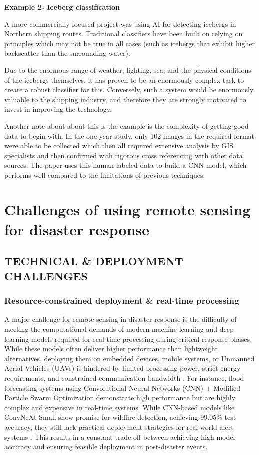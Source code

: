 \documentclass[conference,a4paper]{IEEEtran}
\begin{document}
\textbf{Example 2- Iceberg classification}

A more commercially focused project was using AI for detecting icebergs in Northern shipping routes. Traditional classifiers have been built on relying on principles which may not be true in all cases (such as icebergs that exhibit higher backscatter than the surrounding water). 

Due to the enormous range of weather, lighting, sea,  and the physical conditions of the icebergs themselves, it has proven to be an enormously complex task to create a robust classifier for this. Conversely, such a system would be enormously valuable to the shipping industry, and therefore they are strongly motivated to invest in improving the technology.

Another note about about this is the example is the complexity of getting good data to begin with. In the one year study, only 102 images in the required format were able to be collected which then all required extensive analysis by GIS specialists and then confirmed with rigorous cross referencing with other data sources. The paper uses this human labeled data to build a CNN model, which performs well compared to the limitations of previous techniques.




\section{Challenges of using remote sensing for disaster response}


\subsection{TECHNICAL \& DEPLOYMENT CHALLENGES}

\subsubsection{\textbf{Resource-constrained deployment \& real-time processing}}
A major challenge for remote sensing in disaster response is the difficulty of meeting the computational demands of modern machine learning and deep learning models required for real-time processing during critical response phases. While these models often deliver higher performance than lightweight alternatives, deploying them on embedded devices, mobile systems, or Unmanned Aerial Vehicles (UAVs) is hindered by limited processing power, strict energy requirements, and constrained communication bandwidth \cite{elbohy2025fusion}. For instance, flood forecasting systems using Convolutional Neural Networks (CNN) + Modified Particle Swarm Optimization demonstrate high performance but are highly complex and expensive in real-time systems. While CNN-based models like ConvNeXt-Small show promise for wildfire detection, achieving 99.05\% test accuracy, they still lack practical deployment strategies for real-world alert systems \cite{elbohy2025fusion}. This results in a constant trade-off between achieving high model accuracy and ensuring feasible deployment in post-disaster events.
\end{document}
